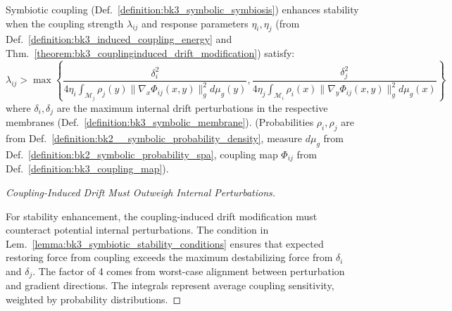 \begin{lemma} \label{lemma:bk3_symbiotic_stability_conditions}
Symbiotic coupling (Def.~\ref{definition:bk3_symbolic_symbiosis}) enhances stability when the coupling strength $\lambda_{ij}$ and response parameters $\eta_i, \eta_j$ (from Def.~\ref{definition:bk3_induced_coupling_energy} and Thm.~\ref{theorem:bk3_couplinginduced_drift_modification}) satisfy:
\[
\lambda_{ij} > \max\left\{\frac{\delta_i^2}{4\eta_i \int_{\mathcal{M}_j} \rho_j(y)\|\nabla_x \Phi_{ij}(x,y)\|_g^2 d\mu_g(y)}, \frac{\delta_j^2}{4\eta_j \int_{\mathcal{M}_i} \rho_i(x)\|\nabla_y \Phi_{ij}(x,y)\|_g^2 d\mu_g(x)}\right\}
\]
where $\delta_i, \delta_j$ are the maximum internal drift perturbations in the respective membranes (Def.~\ref{definition:bk3_symbolic_membrane}). (Probabilities $\rho_i, \rho_j$ are from Def.~\ref{definition:bk2__symbolic_probability_density}, measure $d\mu_g$ from Def.~\ref{definition:bk2_symbolic_probability_spa}, coupling map $\Phi_{ij}$ from Def.~\ref{definition:bk3_coupling_map}).
\end{lemma}

\begin{proof}[Coupling-Induced Drift Must Outweigh Internal Perturbations]
\label{proof:bk3_coupling_vs_perturbation_stability}
\leavevmode

For stability enhancement, the coupling-induced drift modification must counteract potential internal perturbations.
The condition in Lem.~\ref{lemma:bk3_symbiotic_stability_conditions} ensures that expected restoring force from coupling exceeds the maximum destabilizing force from $\delta_i$ and $\delta_j$.
The factor of 4 comes from worst-case alignment between perturbation and gradient directions.
The integrals represent average coupling sensitivity, weighted by probability distributions.
\end{proof}

